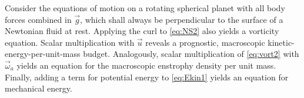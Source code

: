 \label{chap:turbu_categories}
Consider the equations of motion on a rotating spherical planet with all body forces
combined in $\vec{g}$, which shall always be perpendicular to
the surface of a Newtonian fluid at rest. Applying the curl to \eqref{eq:NS2}
also yields a vorticity equation.
Scalar multiplication with $\vec{u}$ reveals a prognostic, macroscopic kinetic-energy-per-unit-mass budget.
Analogously, scalar multiplication of \eqref{eq:vort2} with $\vec{\omega}_{a}$ yields an equation
for the macroscopic enstrophy density per unit mass. Finally, adding a term for potential energy to
\eqref{eq:Ekin1} yields an equation for mechanical energy.




